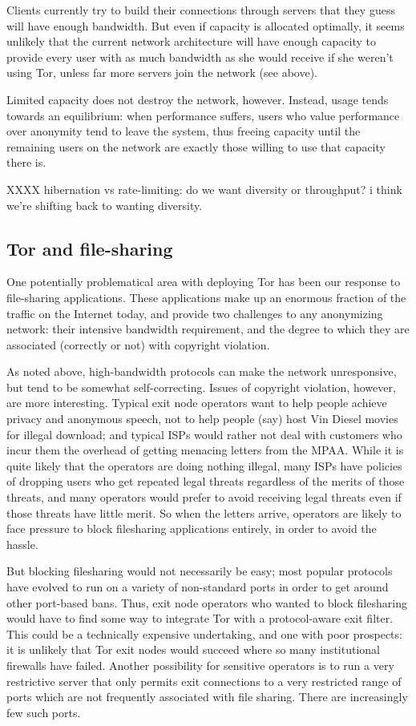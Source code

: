 \documentclass{llncs}
\begin{document}
Clients currently try to build their connections through servers that they
guess will have enough bandwidth.  But even if capacity is allocated
optimally, it seems unlikely that the current network architecture will have
enough capacity to provide every user with as much bandwidth as she would
receive if she weren't using Tor, unless far more servers join the network
(see above).

Limited capacity does not destroy the network, however.  Instead, usage tends
towards an equilibrium: when performance suffers, users who value performance
over anonymity tend to leave the system, thus freeing capacity until the
remaining users on the network are exactly those willing to use that capacity
there is.

XXXX hibernation vs rate-limiting: do we want diversity or throughput? i
think we're shifting back to wanting diversity.

\subsection{Tor and file-sharing}
One potentially problematical area with deploying Tor has been our response
to file-sharing applications.  These applications make up an enormous
fraction of the traffic on the Internet today, and provide two challenges to
any anonymizing network: their intensive bandwidth requirement, and the
degree to which they are associated (correctly or not) with copyright
violation.

As noted above, high-bandwidth protocols can make the network unresponsive,
but tend to be somewhat self-correcting.  Issues of copyright violation,
however, are more interesting.  Typical exit node operators want to help
people achieve privacy and anonymous speech, not to help people (say) host
Vin Diesel movies for illegal download; and typical ISPs would rather not
deal with customers who incur them the overhead of getting menacing letters
from the MPAA.  While it is quite likely that the operators are doing nothing
illegal, many ISPs have policies of dropping users who get repeated legal
threats regardless of the merits of those threats, and many operators would
prefer to avoid receiving legal threats even if those threats have little
merit.  So when the letters arrive, operators are likely to face
pressure to block filesharing applications entirely, in order to avoid the
hassle.

But blocking filesharing would not necessarily be easy; most popular
protocols have evolved to run on a variety of non-standard ports in order to
get around other port-based bans.  Thus, exit node operators who wanted to
block filesharing would have to find some way to integrate Tor with a
protocol-aware exit filter.  This could be a technically expensive
undertaking, and one with poor prospects: it is unlikely that Tor exit nodes
would succeed where so many institutional firewalls have failed.  Another
possibility for sensitive operators is to run a very restrictive server that
only permits exit connections to a very restricted range of ports which are
not frequently associated with file sharing.  There are increasingly few such
ports.
\end{document}

